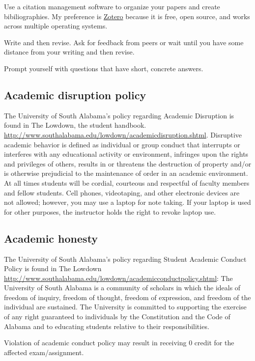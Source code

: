 \documentclass[11pt,]{article}
\begin{document}
Use a citation management software to organize your papers and create
bibiliographies. My preference is \href{https://www.zotero.org/}{Zotero}
because it is free, open source, and works across multiple operating
systems.

Write and then revise. Ask for feedback from peers or wait until you
have some distance from your writing and then revise.

Prompt yourself with questions that have short, concrete answers.

\subsection{Academic disruption
policy}\label{academic-disruption-policy}

The University of South Alabama's policy regarding Academic Disruption
is found in The Lowdown, the student handbook.
\url{http://www.southalabama.edu/lowdown/academicdisruption.shtml}.
Disruptive academic behavior is defined as individual or group conduct
that interrupts or interferes with any educational activity or
environment, infringes upon the rights and privileges of others, results
in or threatens the destruction of property and/or is otherwise
prejudicial to the maintenance of order in an academic environment. At
all times students will be cordial, courteous and respectful of faculty
members and fellow students. Cell phones, videotaping, and other
electronic devices are not allowed; however, you may use a laptop for
note taking. If your laptop is used for other purposes, the instructor
holds the right to revoke laptop use.

\subsection{Academic honesty}\label{academic-honesty}

The University of South Alabama's policy regarding Student Academic
Conduct Policy is found in The Lowdown
\url{http://www.southalabama.edu/lowdown/academicconductpolicy.shtml}:
The University of South Alabama is a community of scholars in which the
ideals of freedom of inquiry, freedom of thought, freedom of expression,
and freedom of the individual are sustained. The University is committed
to supporting the exercise of any right guaranteed to individuals by the
Constitution and the Code of Alabama and to educating students relative
to their responsibilities.

Violation of academic conduct policy may result in receiving 0 credit
for the affected exam/assignment.
\end{document}
